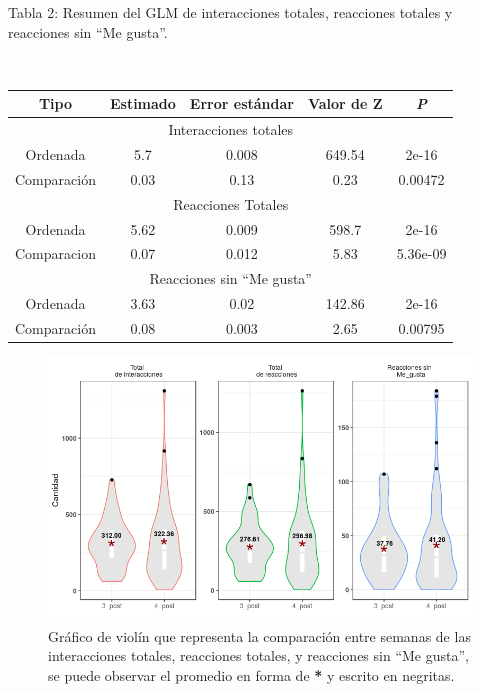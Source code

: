 \documentclass[a4paper,10pt]{article}
\begin{document}
\begin{center}
 \caption{Tabla 2: Resumen del GLM de interacciones totales, reacciones totales y reacciones sin ``Me gusta''.} \\ [0.3cm]
 {\footnotesize
 \begin{tabular}{c|c|c|c|c}
  \hline 
  Tipo & Estimado & Error estándar & Valor de Z & \textit{P} \\
  \hline 
  \multicolumn{5}{c}{Interacciones totales} \\
  \hline
  Ordenada & 5.7 & 0.008 & 649.54 & 2e-16\\
  Comparación & 0.03 & 0.13 & 0.23 & 0.00472\\
  \hline 
  \multicolumn{5}{c}{Reacciones Totales} \\
  \hline
  Ordenada & 5.62 & 0.009 & 598.7 & 2e-16\\
  Comparacion & 0.07 & 0.012 & 5.83 & 5.36e-09\\
  \hline
  \multicolumn{5}{c}{Reacciones sin ``Me gusta''} \\
  \hline
  Ordenada & 3.63 & 0.02 & 142.86 & 2e-16\\
  Comparación & 0.08 & 0.003 & 2.65 & 0.00795 \\
  \hline

 \end{tabular}
 }	    
\end{center}

\begin{figure}[H]
 \begin{center}
    \includegraphics[width=.75\textwidth]{imagenes/graficas/comparacion1.png}
     \caption{Gráfico de violín que representa la comparación  entre semanas de las interacciones totales, reacciones totales, 
     y reacciones sin ``Me gusta'', se puede observar el promedio en forma de \textbf{*} y escrito en negritas.}
 \end{center}

\end{figure}
\end{document}
